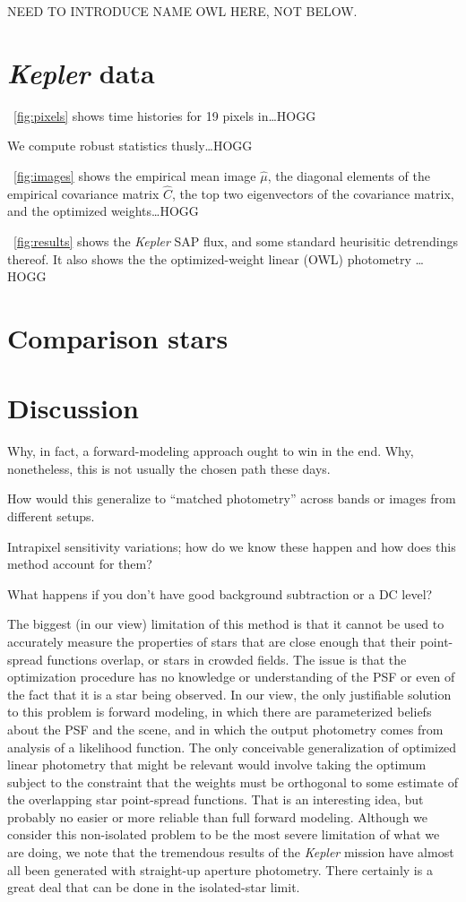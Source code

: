 \documentclass[12pt, letterpaper, preprint]{aastex}
\newcommand{\project}[1]{\textsl{#1}}
\begin{document}
NEED TO INTRODUCE NAME OWL HERE, NOT BELOW.

\section{\project{Kepler} data}

\figurename~\ref{fig:pixels} shows time histories for 19 pixels in\ldots HOGG

We compute robust statistics thusly\ldots HOGG

\figurename~\ref{fig:images} shows the empirical mean image $\hat{\mu}$,
  the diagonal elements of the empirical covariance matrix $\hat{C}$,
  the top two eigenvectors of the covariance matrix,
  and the optimized weights\ldots HOGG

\figurename~\ref{fig:results} shows the \project{Kepler} SAP flux,
  and some standard heurisitic detrendings thereof.
It also shows the the optimized-weight linear (OWL) photometry \ldots HOGG

\section{Comparison stars}

\section{Discussion}

Why, in fact, a forward-modeling approach ought to win in the end.
Why, nonetheless, this is not usually the chosen path these days.

How would this generalize to ``matched photometry'' across bands or images from different setups.

Intrapixel sensitivity variations;
  how do we know these happen and how does this method account for them?

What happens if you don't have good background subtraction or a DC level?

The biggest (in our view) limitation of this method is that it cannot be used
  to accurately measure the properties of stars
  that are close enough that their point-spread functions overlap,
  or stars in crowded fields.
The issue is that the optimization procedure has no knowledge or understanding
  of the PSF or even of the fact that it is a star being observed.
In our view, the only justifiable solution to this problem is forward modeling,
  in which there are parameterized beliefs about the PSF and the scene,
  and in which the output photometry comes from analysis of a likelihood function.
The only conceivable generalization of optimized linear photometry that might be relevant
  would involve taking the optimum subject to the constraint that the weights must be
  orthogonal to some estimate of the overlapping star point-spread functions.
That is an interesting idea,
  but probably no easier or more reliable than full forward modeling.
Although we consider this non-isolated problem to be the most severe limitation of what we are doing,
  we note that the tremendous results of the \project{Kepler} mission
  have almost all been generated with straight-up aperture photometry.
There certainly is a great deal that can be done in the isolated-star limit.
\end{document}

